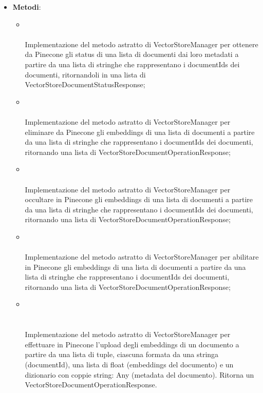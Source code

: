 \documentclass[10pt, a4paper]{article}
\begin{document}
    \label{VectorStorePineconeManagerDettaglio}
    \begin{itemize}
        \item \textbf{Metodi}:
        \begin{itemize}
            \item {}\\ \\
            Implementazione del metodo astratto di VectorStoreManager per ottenere da Pinecone gli status di una lista di documenti dai loro metadati a partire da una lista di stringhe che rappresentano i documentIds dei documenti, ritornandoli in una lista di VectorStoreDocumentStatusResponse;
            \item {}\\ \\
            Implementazione del metodo astratto di VectorStoreManager per eliminare da Pinecone gli embeddings di una lista di documenti a partire da una lista di stringhe che rappresentano i documentIds dei documenti, ritornando una lista di VectorStoreDocumentOperationResponse;
            \item {}\\ \\
            Implementazione del metodo astratto di VectorStoreManager per occultare in Pinecone gli embeddings di una lista di documenti a partire da una lista di stringhe che rappresentano i documentIds dei documenti, ritornando una lista di VectorStoreDocumentOperationResponse;
            \item {}\\ \\
            Implementazione del metodo astratto di VectorStoreManager per abilitare in Pinecone gli embeddings di una lista di documenti a partire da una lista di stringhe che rappresentano i documentIds dei documenti, ritornando una lista di VectorStoreDocumentOperationResponse;
            \item {}\\ \\ \\
            Implementazione del metodo astratto di VectorStoreManager per effettuare in Pinecone l'upload degli embeddings di un documento a partire da una lista di tuple, ciascuna formata da una stringa (documentId), una lista di float (embeddings del documento) e un dizionario con coppie string: Any (metadata del documento). Ritorna un VectorStoreDocumentOperationResponse.
        \end{itemize}
    \end{itemize}
    
\end{document}
